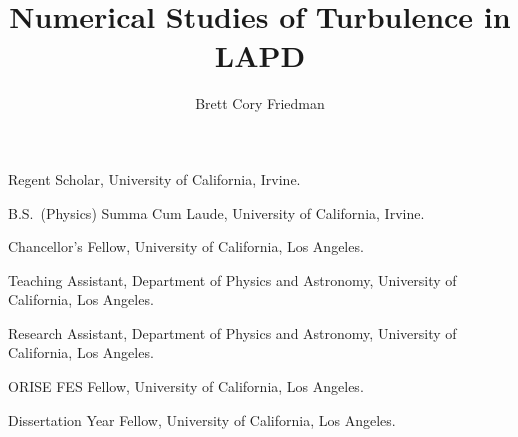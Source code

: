 \title          {Numerical Studies of Turbulence in LAPD}
\author         {Brett Cory Friedman}




\dedication     {\textsl{To my parents \ldots \\}}
                




                {Regent Scholar, University of California, Irvine.}

                {B.S.~(Physics) Summa Cum Laude, University of California, Irvine.}

                {Chancellor's Fellow, University of California, Los Angeles.}

                {Teaching Assistant, Department of Physics and Astronomy, University of California, Los Angeles.}

                {Research Assistant, Department of Physics and Astronomy, University of California, Los Angeles.}

                {ORISE FES Fellow, University of California, Los Angeles.}

                {Dissertation Year Fellow, University of California, Los Angeles.}




